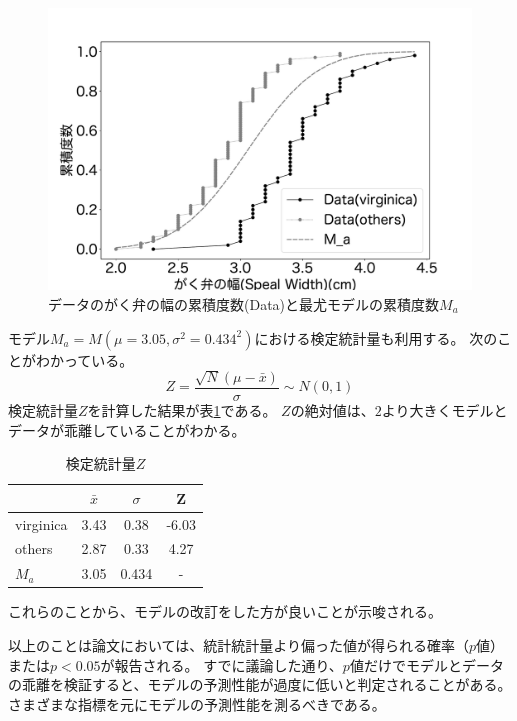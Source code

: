 \begin{figure}
 \begin{center}
  \includegraphics[width=15cm]{./image/15_/speal_width_viri.pdf}
  \caption{データのがく弁の幅の累積度数(Data)と最尤モデルの累積度数$M_a$}
  \label{fig:virginica_speal_width_fig}
 \end{center}
\end{figure}

モデル$M_a=M(\mu=3.05,\sigma^2=0.434^2)$における検定統計量も利用する。
次のことがわかっている。
\begin{equation*}
    Z = \frac{\sqrt{N}(\mu-\bar{x})}{\sigma} \sim N(0,1)
\end{equation*}
検定統計量$Z$を計算した結果が表\ref{table:speal_width_Z}である。
$Z$の絶対値は、$2$より大きくモデルとデータが乖離していることがわかる。

\begin{table}
 \caption{検定統計量$Z$}
 \label{table:speal_width_Z}
 \centering
 \begin{tabular}{lccc}
  \hline
  {} &   $\bar{x} $ &  $\sigma$  &     Z \\
  \hline \hline
  virginica &  3.43 &  0.38 & -6.03 \\
  others    &  2.87 &  0.33 &  4.27 \\
  $M_a$ & 3.05 & 0.434 & - \\
  \hline
 \end{tabular}
\end{table}

これらのことから、モデルの改訂をした方が良いことが示唆される。

以上のことは論文においては、統計統計量より偏った値が得られる確率（$p$値）または$p<0.05$が報告される。
すでに議論した通り、$p$値だけでモデルとデータの乖離を検証すると、モデルの予測性能が過度に低いと判定されることがある。さまざまな指標を元にモデルの予測性能を測るべきである。

